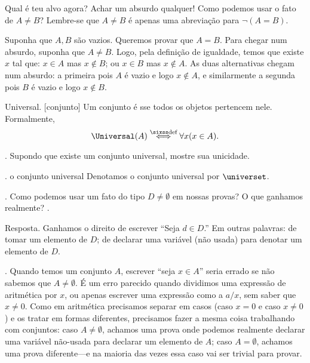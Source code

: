 \hint
Qual é teu alvo agora?
Achar um absurdo qualquer!
Como podemos usar o fato de $A \neq B$?
Lembre-se que $A \neq B$ é apenas uma abreviação para $\lnot(A = B)$.

\solution
Suponha que $A,B$ são vazios.
Queremos provar que $A = B$.
Para chegar num absurdo, suponha que $A \neq B$.
Logo, pela definição de igualdade, temos
que existe $x$ tal que:
$x \in A$ mas $x \notin B$; ou $x \in B$ mas $x \notin A$.
As duas alternativas chegam num absurdo:
a primeira pois $A$ é vazio e logo $x \notin A$, e similarmente
a segunda pois $B$ é vazio e logo $x \notin B$.

\endexercise

 Universal.
[conjunto]%
%
\label{universal}%
Um conjunto é  sse todos os objetos pertencem nele.
Formalmente,
$$
\Universal(A) \defiff \forall x(x \in A).
$$

\exercise.
\label{naive_uniqueness_of_universet}
Supondo que existe um conjunto universal, mostre sua unicidade.

\endexercise

.
\label{universet_symbol}%
\sdefined {\universet} {o conjunto universal}%
Denotamos o conjunto universal por $\universet$.

\question.
Como podemos usar um fato do tipo $D\neq \emptyset$ em nossas provas?
O que ganhamos realmente?
\spoiler.

\blah Resposta.
Ganhamos o direito de escrever ``Seja $d\in D$.''
Em outras palavras: de tomar um elemento de $D$;
de declarar uma variável (não usada) para denotar um elemento de $D$.

\warning.
\label{letting_in_empty_like_division_by_0}%
Quando temos um conjunto $A$, escrever ``seja $x \in A$''
seria errado se não sabemos que $A \neq \emptyset$.
É um erro parecido quando dividimos uma expressão de aritmética
por $x$, ou apenas escrever uma expressão como a $a/x$,
sem saber que $x\neq 0$.
Como em aritmética precisamos separar em casos
(caso $x = 0$ e caso $x\neq 0$) e os tratar em formas diferentes,
precisamos fazer a mesma coisa trabalhando com conjuntos:
caso $A \neq \emptyset$, achamos uma prova onde podemos
realmente declarar uma variável não-usada para declarar
um elemento de $A$;
caso $A = \emptyset$, achamos uma prova
diferente---e na maioria das vezes essa caso vai ser trivial
para provar.

